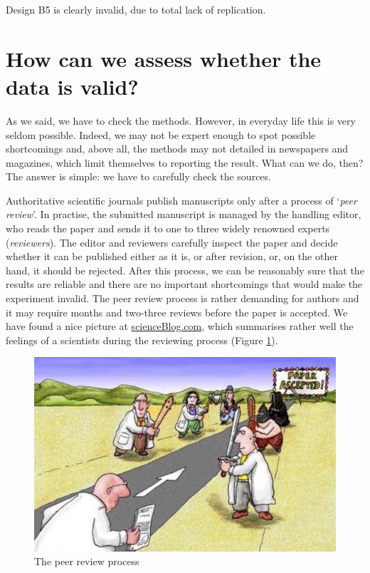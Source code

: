 \documentclass[a4paper,12pt,oneside]{book}
\begin{document}
Design B5 is clearly invalid, due to total lack of replication.

\hypertarget{how-can-we-assess-whether-the-data-is-valid}{%
\section{How can we assess whether the data is valid?}\label{how-can-we-assess-whether-the-data-is-valid}}

As we said, we have to check the methods. However, in everyday life this is very seldom possible. Indeed, we may not be expert enough to spot possible shortcomings and, above all, the methods may not detailed in newspapers and magazines, which limit themselves to reporting the result. What can we do, then? The answer is simple: we have to carefully check the sources.

Authoritative scientific journals publish manuscripts only after a process of `\emph{peer review}'. In practise, the submitted manuscript is managed by the handling editor, who reads the paper and sends it to one to three widely renowned experts (\emph{reviewers}). The editor and reviewers carefully inspect the paper and decide whether it can be published either as it is, or after revision, or, on the other hand, it should be rejected. After this process, we can be reasonably sure that the results are reliable and there are no important shortcomings that would make the experiment invalid. The peer review process is rather demanding for authors and it may require months and two-three reviews before the paper is accepted. We have found a nice picture at \href{http://scienceblogs.com/startswithabang/2013/06/07/the-4-jobs-of-a-referee-in-peer-review/}{scienceBlog.com}, which summarises rather well the feelings of a scientists during the reviewing process (Figure \ref{fig:figName3}).

\begin{figure}

{\centering \includegraphics[width=0.75\linewidth]{_images/PeerReview} 

}

\caption{The peer review process}\label{fig:figName3}
\end{figure}
\end{document}
